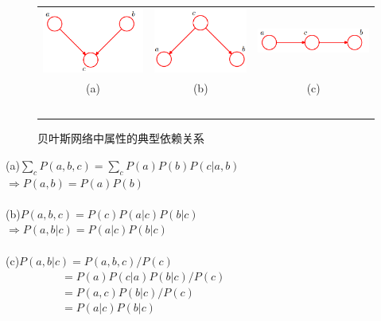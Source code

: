 \begin{frame}
	\begin{figure}
		\centering
		\begin{tabular}{ccc}
			\includegraphics[width=0.28\linewidth]{topic/BayesianNetwork/head2head.png} &
			\includegraphics[width=0.28\linewidth]{topic/BayesianNetwork/tail2tail.png} &
			\includegraphics[width=0.28\linewidth]{topic/BayesianNetwork/head2tail.png}\\
			(a) & (b) & (c) \\
			~\\
		\end{tabular}
		\caption{贝叶斯网络中属性的典型依赖关系}
		\label{0-004}
		\vspace{-0.5em}
	\end{figure}
\end{frame}

\begin{frame}
	(a)$\sum_{c}P(a,b,c)=\sum_{c}P(a)P(b)P(c|a,b)$ \\ $\Rightarrow P(a,b)=P(a)P(b)$
	~\\
	~\\
	(b)$P(a,b,c)=P(c)P(a|c)P(b|c)$ \\ $\Rightarrow P(a,b|c)=P(a|c)P(b|c)$
	~\\
	~\\
	(c)$P(a,b|c)=P(a,b,c)/P(c)$ \\ $\qquad\qquad\quad=P(a)P(c|a)P(b|c)/P(c)$ \\ $\qquad\qquad\quad=P(a,c)P(b|c)/P(c)$ \\ $\qquad\qquad\quad=P(a|c)P(b|c)$
\end{frame}

